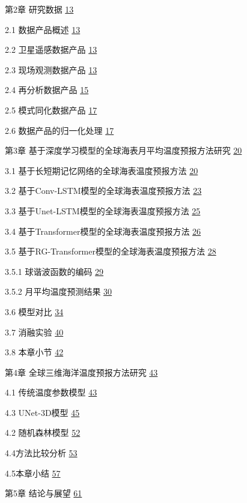 \documentclass[
  12pt,
]{article}
\begin{document}
第2章 研究数据 \hyperref[ux7b2c2ux7ae0-ux7814ux7a76ux6570ux636e]{13}

2.1 数据产品概述 \hyperref[_Toc1882328034]{13}

2.2 卫星遥感数据产品 \hyperref[_Toc1705663481]{13}

2.3 现场观测数据产品 \hyperref[_Toc326921364]{13}

2.4 再分析数据产品 \hyperref[_Toc1304195722]{15}

2.5 模式同化数据产品 \hyperref[_Toc251914725]{17}

2.6 数据产品的归一化处理 \hyperref[_Toc1240514838]{17}

第3章 基于深度学习模型的全球海表月平均温度预报方法研究
\hyperref[ux7b2c3ux7ae0-ux57faux4e8eux6df1ux5ea6ux5b66ux4e60ux6a21ux578bux7684ux5168ux7403ux6d77ux8868ux6708ux5e73ux5747ux6e29ux5ea6ux9884ux62a5ux65b9ux6cd5ux7814ux7a76]{20}

3.1 基于长短期记忆网络的全球海表温度预报方法
\hyperref[_Toc2038602343]{20}

3.2 基于Conv-LSTM模型的全球海表温度预报方法
\hyperref[_Toc1835474563]{23}

3.3 基于Unet-LSTM模型的全球海表温度预报方法 \hyperref[_Toc218391186]{25}

3.4 基于Transformer模型的全球海表温度预报方法
\hyperref[_Toc451110379]{26}

3.5 基于RG-Transformer模型的全球海表温度预报方法
\hyperref[_Toc1194865943]{28}

3.5.1 球谐波函数的编码 \hyperref[_Toc992320904]{29}

3.5.2 月平均温度预测结果 \hyperref[_Toc579430926]{30}

3.6 模型对比 \hyperref[_Toc1804717784]{34}

3.7 消融实验 \hyperref[_Toc193900444]{40}

3.8 本章小节 \hyperref[_Toc1152069809]{42}

第4章 全球三维海洋温度预报方法研究
\hyperref[ux5168ux7403ux4e09ux7ef4ux6d77ux6d0bux6e29ux5ea6ux9884ux62a5ux65b9ux6cd5ux7814ux7a76]{43}

4.1 传统温度参数模型 \hyperref[_Toc992953483]{43}

4.3 UNet-3D模型 \hyperref[_Hlk162229635]{45}

4.2 随机森林模型 \hyperref[_Toc1895955379]{52}

4.4方法比较分析 \hyperref[_Toc959700667]{53}

4.5本章小结 \hyperref[_Toc215191079]{57}

第5章 结论与展望
\hyperref[ux7b2c5ux7ae0-ux7ed3ux8bbaux4e0eux5c55ux671b]{61}
\end{document}
